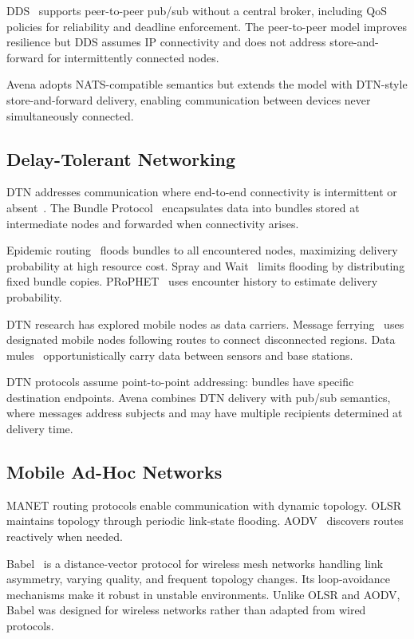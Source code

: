 \documentclass[journal]{IEEEtran}
\begin{document}
DDS~\cite{dds} supports peer-to-peer pub/sub without a central broker, including QoS policies for reliability and deadline enforcement. The peer-to-peer model improves resilience but DDS assumes IP connectivity and does not address store-and-forward for intermittently connected nodes.

Avena adopts NATS-compatible semantics but extends the model with DTN-style store-and-forward delivery, enabling communication between devices never simultaneously connected.

\subsection{Delay-Tolerant Networking}

DTN addresses communication where end-to-end connectivity is intermittent or absent~\cite{fall2003dtn}. The Bundle Protocol~\cite{rfc5050} encapsulates data into bundles stored at intermediate nodes and forwarded when connectivity arises.

Epidemic routing~\cite{vahdat2000epidemic} floods bundles to all encountered nodes, maximizing delivery probability at high resource cost. Spray and Wait~\cite{spyropoulos2005spray} limits flooding by distributing fixed bundle copies. PRoPHET~\cite{lindgren2003probabilistic} uses encounter history to estimate delivery probability.

DTN research has explored mobile nodes as data carriers. Message ferrying~\cite{zhao2004message} uses designated mobile nodes following routes to connect disconnected regions. Data mules~\cite{shah2003data} opportunistically carry data between sensors and base stations.

DTN protocols assume point-to-point addressing: bundles have specific destination endpoints. Avena combines DTN delivery with pub/sub semantics, where messages address subjects and may have multiple recipients determined at delivery time.

\subsection{Mobile Ad-Hoc Networks}

MANET routing protocols enable communication with dynamic topology. OLSR~\cite{rfc3626} maintains topology through periodic link-state flooding. AODV~\cite{rfc3561} discovers routes reactively when needed.

Babel~\cite{rfc8966} is a distance-vector protocol for wireless mesh networks handling link asymmetry, varying quality, and frequent topology changes. Its loop-avoidance mechanisms make it robust in unstable environments. Unlike OLSR and AODV, Babel was designed for wireless networks rather than adapted from wired protocols.
\end{document}
